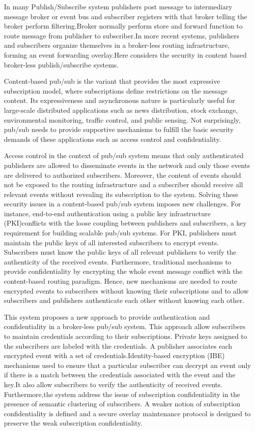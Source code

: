 \documentclass[MTech]{iitmdiss}
\begin{document}
In many Publish/Subscribe system publishers post message to intermediary message broker or event bus and subscriber registers with that broker telling the broker perform filtering.Broker normally perform store and forward function to route message from publisher to subscriber.In more recent systems, publishers and subscribers
organize themselves in a broker-less routing infrastructure,
forming an event forwarding overlay.Here considers the security in content based broker-less publish/subscribe systems.


Content-based pub/sub is the variant that provides the
most expressive subscription model, where subscriptions
define restrictions on the message content. Its expressiveness and asynchronous nature is particularly useful for
large-scale distributed applications such as news distribution, stock exchange, environmental monitoring, traffic
control, and public sensing. Not surprisingly, pub/sub
needs to provide supportive mechanisms to fulfill the basic
security demands of these applications such as access
control and confidentiality.

Access control in the context of pub/sub system means
that only authenticated publishers are allowed to disseminate events in the network and only those events are delivered to authorized subscribers. Moreover, the content
of events should not be exposed to the routing infrastructure and a subscriber should receive all relevant events
without revealing its subscription to the system. Solving
these security issues in a content-based pub/sub system
imposes new challenges. For instance, end-to-end authentication using a public key infrastructure (PKI)conflicts with the loose coupling between publishers and subscribers, a
key requirement for building scalable pub/sub systems.
For PKI, publishers must maintain the public keys of all
interested subscribers to encrypt events. Subscribers must
know the public keys of all relevant publishers to verify the
authenticity of the received events. Furthermore, traditional
mechanisms to provide confidentiality by encrypting the
whole event message conflict with the content-based
routing paradigm. Hence, new mechanisms are needed to
route encrypted events to subscribers without knowing
their subscriptions and to allow subscribers and publishers
authenticate each other without knowing each other.


This  system proposes a new approach to provide authentication and confidentiality in a
broker-less pub/sub system. This approach allow subscribers to maintain credentials according to their subscriptions. Private keys assigned to the subscribers are labeled
with the credentials. A publisher associates each encrypted event with a set of credentials.Identity-based encryption (IBE) mechanisms used  to ensure that a
particular subscriber can decrypt an event only if there is a
match between the credentials associated with the event
and the key.It also  allow subscribers to verify the authenticity of received events. Furthermore,the system address the issue of subscription confidentiality in the presence of
semantic clustering of subscribers. A weaker notion of subscription confidentiality is defined and a secure overlay maintenance protocol is designed to preserve the weak subscription confidentiality.
\clearpage
\pagebreak
\end{document}
